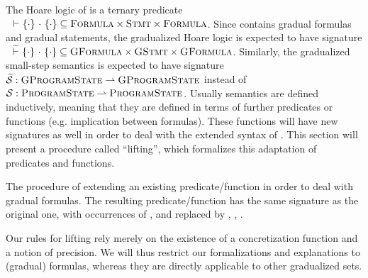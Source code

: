 The Hoare logic of \svl is a ternary predicate ${~} \,\,{\vdash}\,\, \{{\cdot}\} ~{\cdot}~ \{{\cdot}\} \subseteq \textup{\textsc{Formula}} \times \textup{\textsc{Stmt}} \times \textup{\textsc{Formula}}$.
Since \gvl contains gradual formulas and gradual statements, the gradualized Hoare logic is expected to have signature ${~} \,\,\widetilde{\vdash}\,\, \{{\cdot}\} ~{\cdot}~ \{{\cdot}\} \subseteq \textup{\textsc{GFormula}} \times \textup{\textsc{GStmt}} \times \textup{\textsc{GFormula}}$.
Similarly, the gradualized small-step semantics is expected to have signature $\widetilde{\mathcal{S}} : \textup{\textsc{GProgramState}} \rightharpoonup \textup{\textsc{GProgramState}}$ instead of $\mathcal{S} : \textup{\textsc{ProgramState}} \rightharpoonup \textup{\textsc{ProgramState}}$.
Usually semantics are defined inductively, meaning that they are defined in terms of further predicates or functions (e.g. implication between formulas).
These functions will have new signatures as well in order to deal with the extended syntax of \gvl.
This section will present a procedure called “lifting”, which formalizes this adaptation of predicates and functions.

\begin{definition}
    The procedure of extending an existing predicate/function in order to deal with gradual formulas.
    The resulting predicate/function has the same signature as the original one, with occurrences of \setFormula, \setStmt and \setProgramState replaced by \setGFormula, \setGStmt, \setGProgramState.
\end{definition}

Our rules for lifting rely merely on the existence of a concretization function and a notion of precision.
We will thus restrict our formalizations and explanations to (gradual) formulas, whereas they are directly applicable to other gradualized sets.